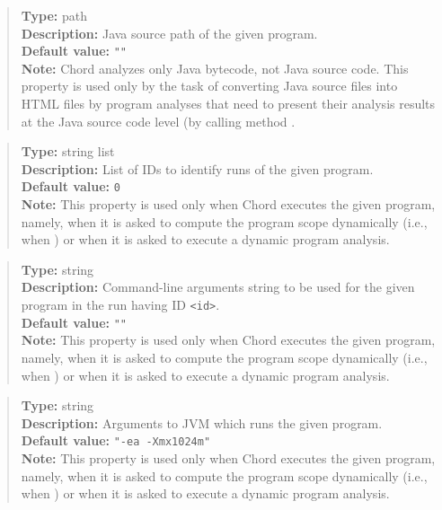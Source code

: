 \begin{quote}
{\bf Type:} path \\
{\bf Description:} Java source path of the given program. \\
{\bf Default value:} {\tt ""} \\
{\bf Note:} Chord analyzes only Java bytecode, not Java source code.  This property is used only by the task of converting Java source files into HTML files by program analyses that need to present their analysis results at the Java source code level (by calling method .
\end{quote}

\begin{quote}
{\bf Type:} string list \\
{\bf Description:} List of IDs to identify runs of the given program. \\
{\bf Default value:} {\tt 0} \\
{\bf Note:} This property is used only when Chord executes the given program, namely, when it is asked to compute the program scope dynamically (i.e., when ) or when it is asked to execute a dynamic program analysis. 
\end{quote}

\begin{quote}
{\bf Type:} string \\
{\bf Description:} Command-line arguments string to be used for the given program in the run having ID {\tt <id>}. \\
{\bf Default value:} {\tt ""} \\
{\bf Note:} This property is used only when Chord executes the given program, namely, when it is asked to compute the program scope dynamically (i.e., when ) or when it is asked to execute a dynamic program analysis.
\end{quote}

\begin{quote}
{\bf Type:} string \\
{\bf Description:} Arguments to JVM which runs the given program. \\
{\bf Default value:} {\tt "-ea -Xmx1024m"} \\
{\bf Note:} This property is used only when Chord executes the given program, namely, when it is asked to compute the program scope dynamically (i.e., when ) or when it is asked to execute a dynamic program analysis. 
\end{quote}

